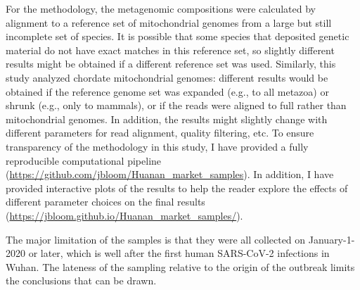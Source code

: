 \documentclass[9pt,twocolumn,twoside]{gsajnl_modified}
\begin{document}
For the methodology, the metagenomic compositions were calculated by alignment to a reference set of mitochondrial genomes from a large but still incomplete set of species.
It is possible that some species that deposited genetic material do not have exact matches in this reference set, so slightly different results might be obtained if a different reference set was used.
Similarly, this study analyzed chordate mitochondrial genomes: different results would be obtained if the reference genome set was expanded (e.g., to all metazoa) or shrunk (e.g., only to mammals), or if the reads were aligned to full rather than mitochondrial genomes.
In addition, the results might slightly change with different parameters for read alignment, quality filtering, etc.
To ensure transparency of the methodology in this study, I have provided a fully reproducible computational pipeline (\url{https://github.com/jbloom/Huanan_market_samples}).
In addition, I have provided interactive plots of the results to help the reader explore the effects of different parameter choices on the final results (\url{https://jbloom.github.io/Huanan_market_samples/}).

The major limitation of the samples is that they were all collected on January-1-2020 or later, which is well after the first human SARS-CoV-2 infections in Wuhan.
The lateness of the sampling relative to the origin of the outbreak limits the conclusions that can be drawn.
\end{document}
